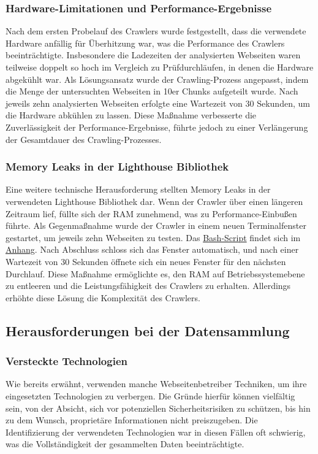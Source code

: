 \documentclass[Bachelor,BIF,german,IEEE]{BASE/twbook}
\begin{document}
\subsubsection{Hardware-Limitationen und Performance-Ergebnisse}
Nach dem ersten Probelauf des Crawlers wurde festgestellt, dass die verwendete Hardware anfällig für Überhitzung war, was die Performance des Crawlers beeinträchtigte. Insbesondere die Ladezeiten der analysierten Webseiten waren teilweise doppelt so hoch im Vergleich zu Prüfdurchläufen, in denen die Hardware abgekühlt war. Als Lösungsansatz wurde der Crawling-Prozess angepasst, indem die Menge der untersuchten Webseiten in 10er Chunks aufgeteilt wurde. Nach jeweils zehn analysierten Webseiten erfolgte eine Wartezeit von 30 Sekunden, um die Hardware abkühlen zu lassen. Diese Maßnahme verbesserte die Zuverlässigkeit der Performance-Ergebnisse, führte jedoch zu einer Verlängerung der Gesamtdauer des Crawling-Prozesses.

\subsubsection{Memory Leaks in der Lighthouse Bibliothek}
Eine weitere technische Herausforderung stellten Memory Leaks in der verwendeten Lighthouse Bibliothek dar. Wenn der Crawler über einen längeren Zeitraum lief, füllte sich der RAM zunehmend, was zu Performance-Einbußen führte. Als Gegenmaßnahme wurde der Crawler in einem neuen Terminalfenster gestartet, um jeweils zehn Webseiten zu testen. Das \hyperref[code:run]{Bash-Script} findet sich im \hyperref[chap:appendix]{Anhang}. Nach Abschluss schloss sich das Fenster automatisch, und nach einer Wartezeit von 30 Sekunden öffnete sich ein neues Fenster für den nächsten Durchlauf. Diese Maßnahme ermöglichte es, den RAM auf Betriebssystemebene zu entleeren und die Leistungsfähigkeit des Crawlers zu erhalten. Allerdings erhöhte diese Lösung die Komplexität des Crawlers.

\subsection{Herausforderungen bei der Datensammlung}

\subsubsection{Versteckte Technologien}
Wie bereits erwähnt, verwenden manche Webseitenbetreiber Techniken, um ihre eingesetzten Technologien zu verbergen. Die Gründe hierfür können vielfältig sein, von der Absicht, sich vor potenziellen Sicherheitsrisiken zu schützen, bis hin zu dem Wunsch, proprietäre Informationen nicht preiszugeben. Die Identifizierung der verwendeten Technologien war in diesen Fällen oft schwierig, was die Vollständigkeit der gesammelten Daten beeinträchtigte.
\end{document}
